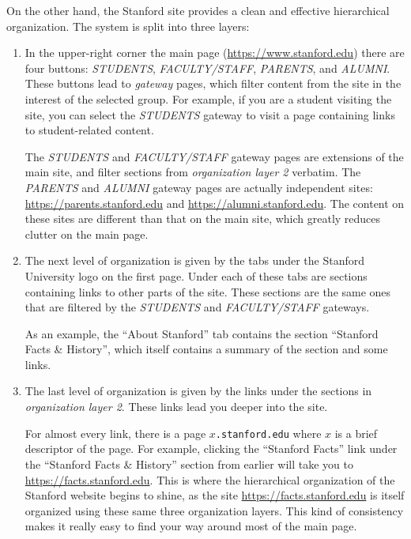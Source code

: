 On the other hand, the Stanford site provides a clean and effective hierarchical
organization. The system is split into three layers:
\begin{enumerate}
    \item In the upper-right corner the main page (\url{https://www.stanford.edu})
    there are four buttons: \textsl{STUDENTS}, \textsl{FACULTY/STAFF},
    \textsl{PARENTS}, and \textsl{ALUMNI}. These buttons lead to \textit{gateway}
    pages, which filter content from the site in the interest of the selected group.
    For example, if you are a student visiting the site, you can select the
    \textsl{STUDENTS} gateway to visit a page containing links to student-related content.

    The \textsl{STUDENTS} and \textsl{FACULTY/STAFF} gateway pages are extensions
    of the main site, and filter sections from \textsl{organization layer 2}
    verbatim. The \textsl{PARENTS} and \textsl{ALUMNI} gateway pages are actually
    independent sites: \url{https://parents.stanford.edu} and
    \url{https://alumni.stanford.edu}. The content on these sites are different
    than that on the main site, which greatly reduces clutter on the main page.

    \item The next level of organization is given by the tabs under the
    Stanford University logo on the first page. Under each of these tabs are
    sections containing links to other parts of the site. These sections are
    the same ones that are filtered by the \textsl{STUDENTS} and
    \textsl{FACULTY/STAFF} gateways.

    As an example, the ``About Stanford'' tab contains the section
    ``Stanford Facts \& History'', which itself contains a summary of the
    section and some links.

    \item The last level of organization is given by the links under the
    sections in \textsl{organization layer 2}. These links lead you deeper
    into the site.

    For almost every link, there is a page \texttt{$x$.stanford.edu} where
    $x$ is a brief descriptor of the page. For example, clicking the
    ``Stanford Facts'' link under the ``Stanford Facts \& History'' section
    from earlier will take you to \url{https://facts.stanford.edu}. This is
    where the hierarchical organization of the Stanford website begins to shine,
    as the site \url{https://facts.stanford.edu} is itself organized using these
    same three organization layers. This kind of consistency makes it really easy
    to find your way around most of the main page.
\end{enumerate}

